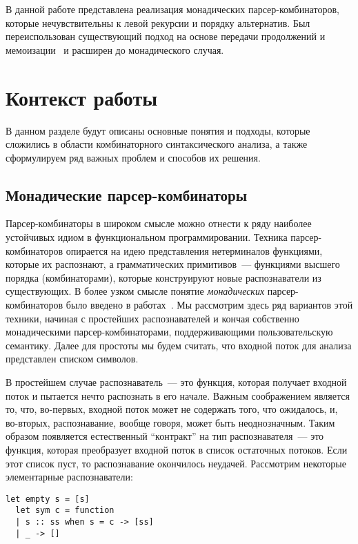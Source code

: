 \documentclass[conference]{IEEEtran}
\begin{document}
В данной работе представлена реализация монадических парсер-комбинаторов, которые нечувствительны к левой рекурсии и порядку альтернатив. Был переиспользован
существующий подход на основе передачи продолжений и мемоизации~\cite{meerkat} и расширен до монадического случая.

\section{Контекст работы}

В данном разделе будут описаны основные понятия и подходы, которые сложились в области комбинаторного синтаксического анализа, а также сформулируем ряд важных проблем и
способов их решения.

\subsection{Монадические парсер-комбинаторы}

Парсер-комбинаторы в широком смысле можно отнести к ряду наиболее устойчивых идиом в функциональном программировании. Техника парсер-комбинаторов опирается на идею
представления нетерминалов функциями, которые их распознают, а грамматических примитивов~--- функциями высшего порядка (комбинаторами), которые конструируют новые
распознаватели из существующих. В более узком смысле понятие \emph{монадических} парсер-комбинаторов было введено в работах~\cite{meijer,wadler}. Мы рассмотрим здесь ряд вариантов
этой техники, начиная с простейших распознавателей и кончая собственно монадическими парсер-комбинаторами, поддерживающими пользовательскую семантику. Далее для простоты
мы будем считать, что входной поток для анализа представлен списком символов.

В простейшем случае распознаватель~--- это функция, которая получает входной поток и пытается нечто распознать в его начале. Важным соображением является то, что, во-первых,
входной поток может не содержать того, что ожидалось, и, во-вторых, распознавание, вообще говоря, может быть неоднозначным. Таким образом появляется естественный ``контракт''
на тип распознавателя~--- это функция, которая преобразует входной поток в список остаточных потоков. Если этот список пуст, то распознавание окончилось неудачей.
Рассмотрим некоторые элементарные распознаватели:

\begin{lstlisting}[basicstyle=\small]
  let empty s = [s]
  let sym c = function
  | s :: ss when s = c -> [ss]
  | _ -> []
\end{lstlisting}
\end{document}
